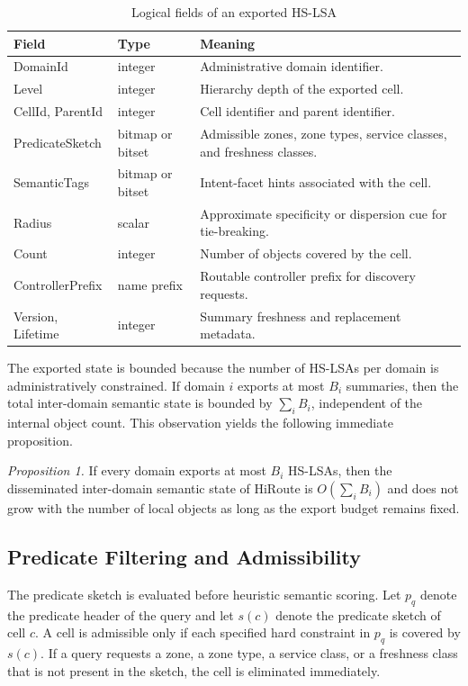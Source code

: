 \documentclass[journal]{IEEEtran}
\newcommand{\sysname}{HiRoute}
\newcommand{\hslsa}{HS-LSA}
\begin{document}
\begin{table}[t]
\caption{Logical fields of an exported \hslsa{}}
\label{tab:hslsa}
\centering
\begin{tabularx}{\columnwidth}{@{}>{\raggedright\arraybackslash}p{2.0cm} >{\raggedright\arraybackslash}p{1.2cm} X@{}}
\toprule
Field & Type & Meaning \\
\midrule
DomainId & integer & Administrative domain identifier. \\
Level & integer & Hierarchy depth of the exported cell. \\
CellId, ParentId & integer & Cell identifier and parent identifier. \\
PredicateSketch & bitmap or bitset & Admissible zones, zone types, service classes, and freshness classes. \\
SemanticTags & bitmap or bitset & Intent-facet hints associated with the cell. \\
Radius & scalar & Approximate specificity or dispersion cue for tie-breaking. \\
Count & integer & Number of objects covered by the cell. \\
ControllerPrefix & name prefix & Routable controller prefix for discovery requests. \\
Version, Lifetime & integer & Summary freshness and replacement metadata. \\
\bottomrule
\end{tabularx}
\end{table}

The exported state is bounded because the number of \hslsa{}s per domain is administratively constrained. If domain $i$ exports at most $B_i$ summaries, then the total inter-domain semantic state is bounded by $\sum_i B_i$, independent of the internal object count. This observation yields the following immediate proposition.

\textit{Proposition 1.} If every domain exports at most $B_i$ \hslsa{}s, then the disseminated inter-domain semantic state of \sysname{} is $O\!\left(\sum_i B_i\right)$ and does not grow with the number of local objects as long as the export budget remains fixed.

\subsection{Predicate Filtering and Admissibility}

The predicate sketch is evaluated before heuristic semantic scoring. Let $p_q$ denote the predicate header of the query and let $s(c)$ denote the predicate sketch of cell $c$. A cell is admissible only if each specified hard constraint in $p_q$ is covered by $s(c)$. If a query requests a zone, a zone type, a service class, or a freshness class that is not present in the sketch, the cell is eliminated immediately.
\end{document}
